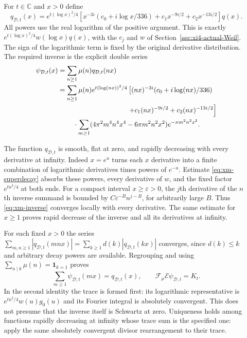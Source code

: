 For $t\in\mathbb C$ and $x>0$ define
\begin{equation}\label{eq:xm-q}
 q_{\mathcal D,t}(x)=e^{t(\log x)^2/4}
 \left[x^{-3i}(c_0+i\log x/336)
       +c_1x^{-9i/2}+c_2x^{-13i/2}\right]q(x).
\end{equation}
All powers use the real logarithm of the positive argument. This is
exactly $e^{t(\log x)^2/4}w(\log x)q(x)$, with the $c_j$ and $w$
of Section~\ref{sec:xi4-actual-Weil}. The sign of the logarithmic
term is fixed by the original derivative distribution.
The required inverse is the explicit double series
\begin{equation}\label{eq:xm-inverse}
\begin{split}
 \psi_{\mathcal D,t}(x)
 &=\sum_{n\ge1}\mu(n)q_{\mathcal D,t}(nx)\\
 &=\sum_{n\ge1}\mu(n)e^{t(\log(nx))^2/4}
 \left[(nx)^{-3i}(c_0+i\log(nx)/336)\right.\\
 &\hspace{36mm}\left.+c_1(nx)^{-9i/2}+c_2(nx)^{-13i/2}\right]\\
 &\hspace{8mm}\cdot\sum_{m\ge1}
 (4\pi^2m^4n^4x^4-6\pi m^2n^2x^2)e^{-\pi m^2n^2x^2}.
\end{split}
\end{equation}

The function $q_{\mathcal D,t}$ is smooth, flat at zero, and rapidly
decreasing with every derivative at infinity. Indeed $x=e^u$ turns
each $x$ derivative into a finite combination of logarithmic
derivatives times powers of $e^{-u}$. Estimate
\eqref{eq:xm-superdecay} absorbs these powers, every derivative of
$w$, and the fixed factor $e^{tu^2/4}$ at both ends.
For a compact interval $x\ge\varepsilon>0$, the $j$th derivative
of the $n$th inverse summand is bounded by
$C\varepsilon^{-B}n^{j-B}$, for arbitrarily large $B$.
Thus \eqref{eq:xm-inverse} converges locally with every derivative.
The same estimate for $x\ge1$ proves rapid decrease of the inverse
and all its derivatives at infinity.

For each fixed $x>0$ the series
$\sum_{m,n\ge1}|q_{\mathcal D,t}(mnx)|
=\sum_{k\ge1}d(k)|q_{\mathcal D,t}(kx)|$ converges, since
$d(k)\le k$ and arbitrary decay powers are available. Regrouping
and using $\sum_{n\mid k}\mu(n)=\mathbf1_{k=1}$ proves
\begin{equation}\label{eq:xm-exact-trace}
 \sum_{m\ge1}\psi_{\mathcal D,t}(mx)=q_{\mathcal D,t}(x),
 \qquad
 \mathscr F_\mu\mathcal E\psi_{\mathcal D,t}=K_t.
\end{equation}
In the second identity the trace is formed first: its logarithmic
representative is $e^{tu^2/4}w(u)g_0(u)$ and its Fourier integral
is absolutely convergent. This does not presume that the inverse
itself is Schwartz at zero. Uniqueness holds among functions rapidly
decreasing at infinity whose trace sum is the specified one: apply
the same absolutely convergent divisor rearrangement to their trace.

